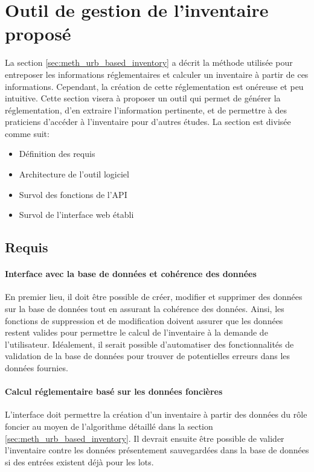 \section{Outil de gestion de l'inventaire proposé}\label{sec:meth_tool}
La section \ref{sec:meth_urb_based_inventory} a décrit la méthode utilisée pour entreposer les informations réglementaires et calculer un inventaire à partir de ces informations. Cependant, la création de cette réglementation est onéreuse et peu intuitive. Cette section visera à proposer un outil qui permet de générer la réglementation, d'en extraire l'information pertinente, et de permettre à des praticiens d'accéder à l'inventaire pour d'autres études. La section est divisée comme suit:
\begin{itemize}
    \item Définition des requis
    \item Architecture de l'outil logiciel
    \item Survol des fonctions de l'API
    \item Survol de l'interface web établi
\end{itemize}
\subsection{Requis}
\paragraph{Interface avec la base de données et cohérence des données}
En premier lieu, il doit être possible de créer, modifier et supprimer des données sur la base de données tout en assurant la cohérence des données. Ainsi, les fonctions de suppression et de modification doivent assurer que les données restent valides pour permettre le calcul de l'inventaire à la demande de l'utilisateur. Idéalement, il serait possible d'automatiser des fonctionnalités de validation de la base de données pour trouver de potentielles erreurs dans les données fournies.
\paragraph{Calcul réglementaire basé sur les données foncières}
L'interface doit permettre la création d'un inventaire à partir des données du rôle foncier au moyen  de l'algorithme détaillé dans la section \ref{sec:meth_urb_based_inventory}. Il devrait ensuite être possible de valider l'inventaire contre les données présentement sauvegardées dans la base de données si des entrées existent déjà pour les lots.
